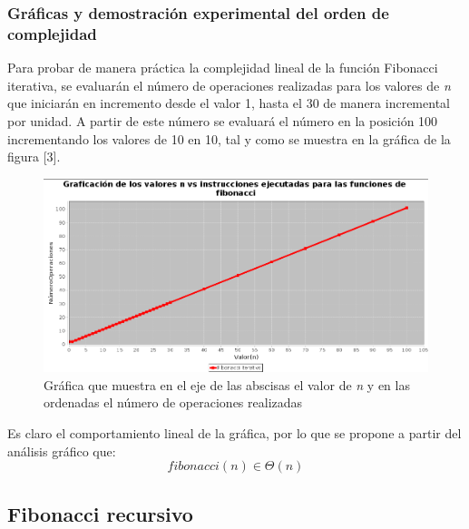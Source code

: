 \documentclass{report}
\begin{document}
        \subsubsection*{Gráficas y demostración experimental del orden de complejidad}
            Para probar de manera práctica la complejidad lineal de la función Fibonacci iterativa, se evaluarán el número de operaciones realizadas para los valores de \textit{n} que iniciarán en incremento desde el valor 1, hasta el 30 de manera incremental por unidad. A partir de este número se evaluará el número en la posición 100 incrementando los valores de 10 en 10, tal y como se muestra en la gráfica de la figura [3].
            
            \hfill \break
            
            \begin{figure}[!h]
                \centering
            	\includegraphics[width=14cm]{Imagenes/FibonacciIterativo.png}
                \caption{Gráfica que muestra en el eje de las abscisas el valor de \textit{n} y en las ordenadas el número de operaciones realizadas}
                \label{fig:my_label}
            \end{figure}
            
            Es claro el comportamiento lineal de la gráfica, por lo que se propone a partir del análisis gráfico que:
            $$fibonacci(n) \in \Theta (n)$$
    
    
    \subsection*{Fibonacci recursivo}
\end{document}
